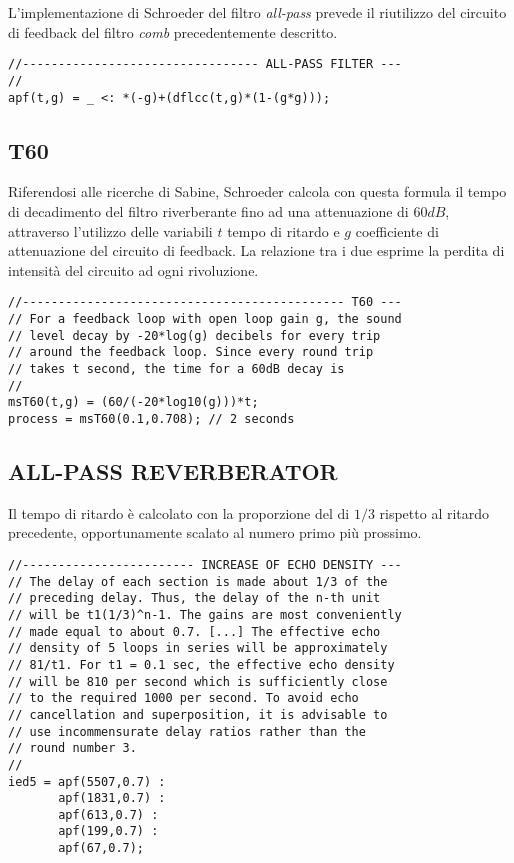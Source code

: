 L'implementazione di Schroeder del filtro \emph{all-pass} prevede il riutilizzo
del circuito di feedback del filtro \emph{comb} precedentemente descritto.

\begin{lstlisting}
//--------------------------------- ALL-PASS FILTER ---
//
apf(t,g) = _ <: *(-g)+(dflcc(t,g)*(1-(g*g)));
\end{lstlisting}


\subsection*{T60}

Riferendosi alle ricerche di Sabine, Schroeder calcola con questa formula il
tempo di decadimento del filtro riverberante fino ad una attenuazione di $60dB$,
attraverso l'utilizzo delle variabili $t$ tempo di ritardo e $g$ coefficiente
di attenuazione del circuito di feedback. La relazione tra i due esprime la
perdita di intensità del circuito ad ogni rivoluzione.

\begin{lstlisting}
//--------------------------------------------- T60 ---
// For a feedback loop with open loop gain g, the sound
// level decay by -20*log(g) decibels for every trip
// around the feedback loop. Since every round trip
// takes t second, the time for a 60dB decay is
//
msT60(t,g) = (60/(-20*log10(g)))*t;
process = msT60(0.1,0.708); // 2 seconds
\end{lstlisting}

\subsection*{ALL-PASS REVERBERATOR}

Il tempo di ritardo è calcolato con la proporzione del di $1/3$ rispetto al
ritardo precedente, opportunamente scalato al numero primo più prossimo.

\begin{lstlisting}
//------------------------ INCREASE OF ECHO DENSITY ---
// The delay of each section is made about 1/3 of the
// preceding delay. Thus, the delay of the n-th unit
// will be t1(1/3)^n-1. The gains are most conveniently
// made equal to about 0.7. [...] The effective echo
// density of 5 loops in series will be approximately
// 81/t1. For t1 = 0.1 sec, the effective echo density
// will be 810 per second which is sufficiently close
// to the required 1000 per second. To avoid echo
// cancellation and superposition, it is advisable to
// use incommensurate delay ratios rather than the
// round number 3.
//
ied5 = apf(5507,0.7) :
       apf(1831,0.7) :
       apf(613,0.7) :
       apf(199,0.7) :
       apf(67,0.7);
\end{lstlisting}

